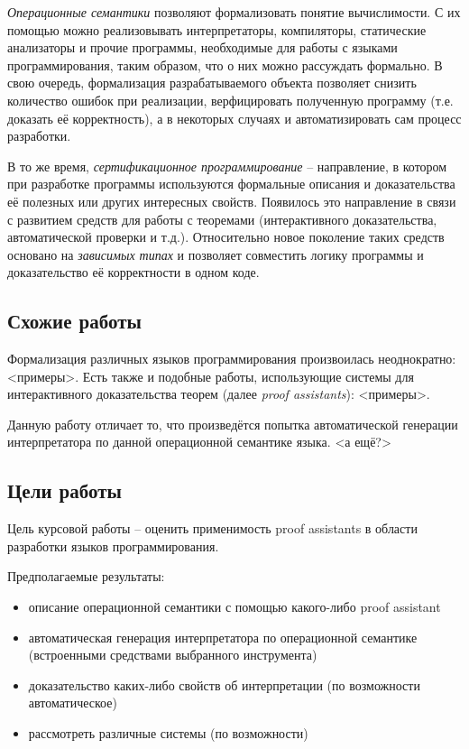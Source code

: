 \documentclass[aps,12pt,final,oneside,onecolumn,musixtex,superscriptaddress,centertags]{article}
\begin{document}
     \emph{Операционные семантики} позволяют формализовать понятие вычислимости. С их помощью можно реализовывать интерпретаторы, компиляторы, статические анализаторы и прочие программы, необходимые для работы с языками программирования, таким образом, что о них можно рассуждать формально. В свою очередь, формализация разрабатываемого объекта позволяет снизить количество ошибок при реализации, верфицировать полученную программу (т.е. доказать её корректность), а в некоторых случаях и автоматизировать сам процесс разработки.

     В то же время, \emph{сертификационное программирование} -- направление, в котором при разработке программы используются формальные описания и доказательства её полезных или других интересных свойств. Появилось это направление в связи с развитием средств для работы с теоремами (интерактивного доказательства, автоматической проверки и т.д.). Относительно новое поколение таких средств основано на \emph{зависимых типах} и позволяет совместить логику программы и доказательство её корректности в одном коде.

  \subsection{Схожие работы}
     Формализация различных языков программирования произвоилась неоднократно: <примеры>. Есть также и подобные работы, использующие системы для интерактивного доказательства теорем (далее \emph{proof assistants}): <примеры>.

     Данную работу отличает то, что произведётся попытка автоматической генерации интерпретатора по данной операционной семантике языка. <а ещё?>

  \newpage
  \subsection{Цели работы}
     Цель курсовой работы -- оценить применимость proof assistants в области разработки языков программирования.

     Предполагаемые результаты:
     \begin{itemize}
        \item описание операционной семантики с помощью какого-либо proof assistant
        \item автоматическая генерация интерпретатора по операционной семантике (встроенными средствами выбранного инструмента)
        \item доказательство каких-либо свойств об интерпретации (по возможности автоматическое)
        \item рассмотреть различные системы (по возможности)
     \end{itemize}
  \newpage
\end{document}
